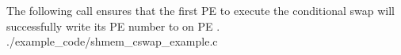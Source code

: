 \begin{apidefinition}

\begin{apiexamples}

\apicexample
    {The following call ensures that the first \ac{PE} to execute the
    conditional swap will successfully write its \ac{PE} number to
     on \ac{PE} .}
    {./example_code/shmem_cswap_example.c}
    {}

\end{apiexamples}

\end{apidefinition}
